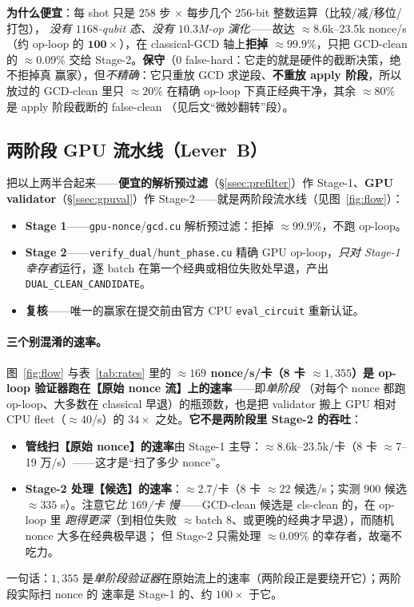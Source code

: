 \documentclass[11pt]{ctexart}
\let\c\lstinline
\begin{document}
\textbf{为什么便宜}：每 shot 只是 $258$ 步 $\times$ 每步几个 256-bit 整数运算（比较/减/移位/打包），
\emph{没有 $1168$-qubit 态、没有 $10.3$M-op 演化}——故达 $\approx$8.6k--23.5k nonce/s（约 op-loop
的 $\mathbf{100\times}$），在 classical-GCD 轴上\textbf{拒掉 $\approx 99.9\%$}，只把 GCD-clean 的
$\approx 0.09\%$ 交给 Stage-2。\textbf{保守}（$0$ false-hard：它走的就是硬件的截断决策，绝不拒掉真
赢家），但\emph{不精确}：它只重放 GCD 求逆段、\textbf{不重放 apply 阶段}，所以放过的 GCD-clean 里只
$\approx 20\%$ 在精确 op-loop 下真正经典干净，其余 $\approx 80\%$ 是 apply 阶段截断的 false-clean
（见后文``微妙翻转''段）。

\subsection{两阶段 GPU 流水线（Lever~B）}
\label{ssec:twostage}
把以上两半合起来——\textbf{便宜的解析预过滤}（§\ref{ssec:prefilter}）作 Stage-1、\textbf{GPU
validator}（§\ref{ssec:gpuval}）作 Stage-2——就是两阶段流水线（见图~\ref{fig:flow}）：
\begin{itemize}[nosep]
  \item \textbf{Stage 1}——\c{gpu-nonce}/\c{gcd.cu} 解析预过滤：拒掉 $\approx 99.9\%$，不跑 op-loop。
  \item \textbf{Stage 2}——\c{verify_dual}/\c{hunt_phase.cu} 精确 GPU op-loop，\emph{只对 Stage-1
  幸存者}运行，逐 batch 在第一个经典或相位失败处早退，产出 \c{DUAL_CLEAN_CANDIDATE}。
  \item \textbf{复核}——唯一的赢家在提交前由官方 CPU \c{eval_circuit} 重新认证。
\end{itemize}

\paragraph{三个别混淆的速率。}图~\ref{fig:flow} 与表~\ref{tab:rates} 里的 \textbf{$\approx 169$
nonce/s/卡（8 卡 $\approx 1{,}355$）是 op-loop 验证器跑在【原始 nonce 流】上的速率}——即\emph{单阶段}
（对每个 nonce 都跑 op-loop、大多数在 classical 早退）的瓶颈数，也是把 validator 搬上 GPU 相对 CPU
fleet（$\approx 40$/s）的 $34\times$ 之处。\textbf{它不是两阶段里 Stage-2 的吞吐}：
\begin{itemize}[nosep]
  \item \textbf{管线扫【原始 nonce】的速率}由 Stage-1 主导：$\approx$8.6k--23.5k/卡（8 卡
  $\approx$7--19 万/s）——这才是``扫了多少 nonce''。
  \item \textbf{Stage-2 处理【候选】的速率}：$\approx 2.7$/卡（8 卡 $\approx 22$ 候选/s；实测 $900$
  候选 $\approx 335$ s）。注意它\emph{比 $169$/卡 慢}——GCD-clean 候选是 cls-clean 的，在 op-loop 里
  \emph{跑得更深}（到相位失败 $\approx$batch 8、或更晚的经典才早退），而随机 nonce 大多在经典极早退；
  但 Stage-2 只需处理 $\approx 0.09\%$ 的幸存者，故毫不吃力。
\end{itemize}
一句话：$1{,}355$ 是\emph{单阶段验证器}在原始流上的速率（两阶段正是要绕开它）；两阶段实际扫 nonce 的
速率是 Stage-1 的、约 $100\times$ 于它。
\end{document}

